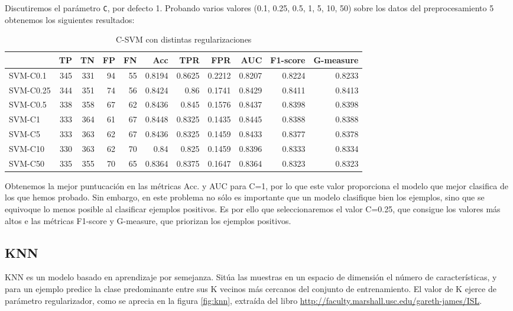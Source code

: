 \documentclass{article}
\begin{document}
Discutiremos el parámetro \texttt{C}, por defecto 1. Probando varios
valores (0.1, 0.25, 0.5, 1, 5, 10, 50) sobre los datos del
preprocesamiento 5 obtenemos los siguientes resultados:

\begin{table}[H]
\centering
\caption{C-SVM con distintas regularizaciones}
\label{tab:svm-tuning}
\begin{tabular}{|lrrrrrrrrrr|}
\hline
 & TP & TN & FP & FN & Acc & TPR & FPR & AUC & F1-score & G-measure\\ \hline
SVM-C0.1 & 345 & 331 & 94 & 55 & 0.8194 & 0.8625 & 0.2212 & 0.8207 & 0.8224 & 0.8233\\
SVM-C0.25 & 344 & 351 & 74 & 56 & 0.8424 & 0.86 & 0.1741 & 0.8429 & 0.8411 & 0.8413\\
SVM-C0.5 & 338 & 358 & 67 & 62 & 0.8436 & 0.845 & 0.1576 & 0.8437 & 0.8398 & 0.8398\\
SVM-C1 & 333 & 364 & 61 & 67 & 0.8448 & 0.8325 & 0.1435 & 0.8445 & 0.8388 & 0.8388\\
SVM-C5 & 333 & 363 & 62 & 67 & 0.8436 & 0.8325 & 0.1459 & 0.8433 & 0.8377 & 0.8378\\
SVM-C10 & 330 & 363 & 62 & 70 & 0.84 & 0.825 & 0.1459 & 0.8396 & 0.8333 & 0.8334\\
SVM-C50 & 335 & 355 & 70 & 65 & 0.8364 & 0.8375 & 0.1647 & 0.8364 & 0.8323 & 0.8323\\
\hline
\end{tabular}
\end{table}

Obtenemos la mejor puntucación en las métricas Acc. y AUC para C=1,
por lo que este valor proporciona el modelo que mejor clasifica de los
que hemos probado. Sin embargo, en este problema no sólo es importante
que un modelo clasifique bien los ejemplos, sino que se equivoque lo
menos posible al clasificar ejemplos positivos. Es por ello que
seleccionaremos el valor C=0.25, que consigue los valores más altos e
las métricas F1-score y G-measure, que priorizan los ejemplos
positivos.

\subsection{KNN}

KNN es un modelo basado en aprendizaje por semejanza. Sitúa las
muestras en un espacio de dimensión el número de características, y
para un ejemplo predice la clase predominante entre sus K vecinos más
cercanos del conjunto de entrenamiento. El valor de K ejerce de
parámetro regularizador, como se aprecia en la figura \ref{fig:knn},
extraída del libro
\href{http://faculty.marshall.usc.edu/gareth-james/ISL}{http://faculty.marshall.usc.edu/gareth-james/ISL}.
\end{document}
